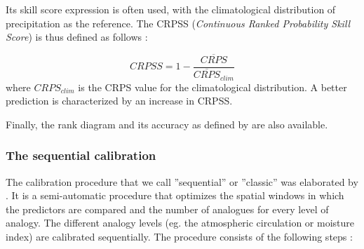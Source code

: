 \documentclass[review]{elsarticle}
\begin{document}
Its skill score expression is often used, with the climatological distribution of precipitation as the reference. The CRPSS (\textit{Continuous Ranked Probability Skill Score}) is thus defined as follows \citep{Bradley2011}:

\begin{equation}
\label{eq:CRPSS}
CRPSS = 1-\frac{\overline{CRPS}}{\overline{CRPS}_{clim}}
\end{equation}
where $CRPS_{clim}$ is the CRPS value for the climatological distribution. A better prediction is characterized by an increase in CRPSS.

Finally, the rank diagram \citep{Talagrand1997} and its accuracy as defined by \citet{Candille2005} are also available.


\subsubsection{The sequential calibration}
\label{sec:sequential}

The calibration procedure that we call ''sequential'' or ''classic'' was elaborated by \citet{Bontron2004} \cite[see also][]{Radanovics2013, BenDaoud2016}. It is a semi-automatic procedure that optimizes the spatial windows in which the predictors are compared and the number of analogues for every level of analogy. The different analogy levels (eg. the atmospheric circulation or moisture index) are calibrated sequentially. The procedure consists of the following steps \citep{Bontron2004}:
\end{document}
